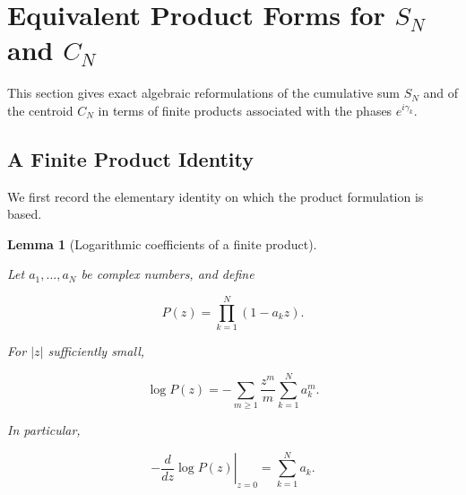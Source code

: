 \documentclass[11pt]{amsart}
\numberwithin{equation}{section}
\theoremstyle{plain}
\newtheorem{lemma}[theorem]{Lemma}
\theoremstyle{definition}
\theoremstyle{remark}
\begin{document}
\section{Equivalent Product Forms for \(S_N\) and \(C_N\)}
\label{sec:product_forms_SN_CN}

This section gives exact algebraic reformulations of the cumulative
sum \(S_N\) and of the centroid \(C_N\) in terms of finite products
associated with the phases \(e^{i\gamma_k}\).

\subsection{A Finite Product Identity}
\label{subsec:finite_product_identity}

We first record the elementary identity on which the product
formulation is based.

\begin{lemma}[Logarithmic coefficients of a finite product]
\label{lem:finite_product_logarithmic_coefficients}

Let \(a_1,\ldots,a_N\) be complex numbers, and define

\begin{equation}
P(z)
=
\prod_{k=1}^{N}
(1-a_k z).
\label{eq:finite_product_definition}
\end{equation}

For \(|z|\) sufficiently small,

\begin{equation}
\log P(z)
=
-
\sum_{m\ge 1}
\frac{z^m}{m}
\sum_{k=1}^{N}
a_k^m.
\label{eq:finite_product_logarithmic_expansion}
\end{equation}

In particular,

\begin{equation}
-
\left.
\frac{d}{dz}
\log P(z)
\right|_{z=0}
=
\sum_{k=1}^{N}
a_k.
\label{eq:first_logarithmic_coefficient}
\end{equation}

\end{lemma}
\end{document}

